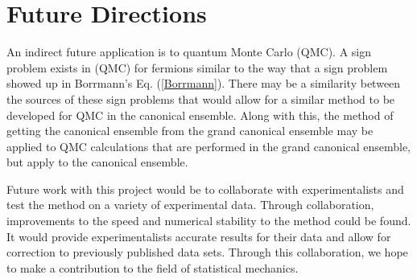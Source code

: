 \section{Future Directions}
An indirect future application is to quantum Monte Carlo (QMC). A sign problem exists in (QMC) for fermions similar to the way that a sign problem showed up in Borrmann's Eq. (\ref{Borrmann}). There may be a similarity between the sources of these sign problems that would allow for a similar method to be developed for QMC in the canonical ensemble. Along with this, the method of getting the canonical ensemble from the grand canonical ensemble may be applied to QMC calculations that are performed in the grand canonical ensemble, but apply to the canonical ensemble. 

Future work with this project would be to collaborate with experimentalists and test the method on a variety of experimental data. Through collaboration, improvements to the speed and numerical stability to the method could be found. It would provide experimentalists accurate results for their data and allow for correction to previously published data sets. Through this collaboration, we hope to make a contribution to the field of statistical mechanics.